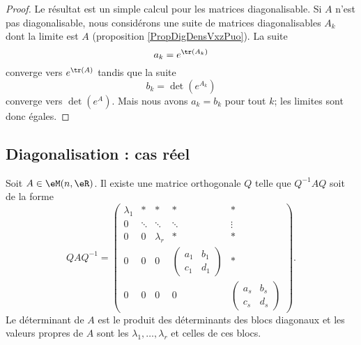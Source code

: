 \begin{proof}
    Le résultat est un simple calcul pour les matrices diagonalisable. Si \( A\) n'est pas diagonalisable, nous considérons une suite de matrices diagonalisables \( A_k\) dont la limite est \( A\) (proposition \ref{PropDigDensVxzPuo}). La suite
    \begin{equation}
        a_k= e^{\tr(A_k)}
    \end{equation}
    converge vers \(  e^{\tr(A)}\) tandis que la suite 
    \begin{equation}
        b_k=\det( e^{A_k})
    \end{equation}
    converge vers \( \det( e^{A})\). Mais nous avons \( a_k=b_k\) pour tout \( k\); les limites sont donc égales.
\end{proof}

\subsection{Diagonalisation : cas réel}

\begin{lemma}  \label{LemSchureRelnrqfiy}
    Soit \( A\in\eM(n,\eR)\). Il existe une matrice orthogonale \( Q\) telle que \( Q^{-1}AQ\) soit de la forme
    \begin{equation}        \label{EqMtrTSqRTA}
        QAQ^{-1}=\begin{pmatrix}
            \lambda_1    &   *    &   *    &   *    &   *\\  
            0    &   \ddots    &   \ddots    &   \ddots    &   \vdots\\  
            0    &   0    &   \lambda_r    &   *    &   *\\  
            0    &   0    &   0    &   \begin{pmatrix}
                a_1    &   b_1    \\ 
                c_1    &   d_1    
            \end{pmatrix}&   *\\  
            0    &   0    &  0     &   0    &   \begin{pmatrix}
                a_s    &   b_s    \\ 
                c_s    &   d_s    
            \end{pmatrix}
        \end{pmatrix}.
    \end{equation}
    Le déterminant de \( A\) est le produit des déterminants des blocs diagonaux et les valeurs propres de \( A\) sont les \( \lambda_1,\ldots, \lambda_r\) et celles de ces blocs.
\end{lemma}

